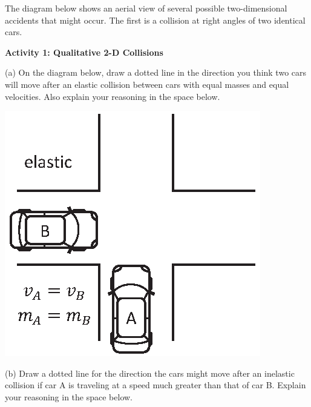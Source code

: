 
The diagram below shows an aerial view of several possible two-dimensional accidents
that might occur. The first is a collision at right angles of two identical
cars.


\textbf{Activity 1: Qualitative 2-D Collisions }

(a) On the diagram below, draw a dotted line in the direction you think
two cars will move after an elastic collision between cars with equal masses and equal velocities.
Also explain your reasoning in the space below.

\hspace{0.3in}
\includegraphics{twod_collisions/two_equal_cars.eps}

\pagebreak[3]
(b) Draw a dotted line for the direction the cars might move after an inelastic collision if car A is traveling
at a speed much greater than that of car B. Explain your reasoning in the space
below. 

